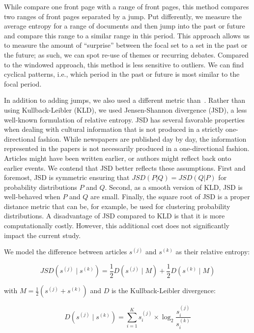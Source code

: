 \documentclass[]{ceurart}
\begin{document}
While \cite{barron_individuals_2018} compare one front page with a range of front pages, this method compares two ranges of front pages separated by a jump. Put differently, we measure the average entropy for a range of documents and then jump into the past or future and compare this range to a similar range in this period. This approach allows us to measure the amount of ``surprise'' between the focal set to a set in the past or the future; as such, we can spot re-use of themes or recurring debates. Compared to the windowed approach, this method is less sensitive to outliers. We can find cyclical patterns, i.e., which period in the past or future is most similar to the focal period.

In addition to adding jumps, we also used a different metric than~\cite{barron_individuals_2018}. Rather than using Kullback-Leibler (KLD), we used Jensen-Shannon divergence (JSD), a less well-known formulation of relative entropy. JSD has several favorable properties when dealing with cultural information that is not produced in a strictly one-directional fashion. While newspapers are published day by day, the information represented in the papers is not necessarily produced in a one-directional fashion. Articles might have been written earlier, or authors might reflect back onto earlier events. We contend that JSD better reflects these assumptions. First and foremost, JSD is symmetric ensuring that $JSD(P|Q) = JSD(Q|P)$ for probability distributions $P$ and $Q$. Second, as a smooth version of KLD, JSD is well-behaved when $P$ and $Q$ are small. Finally, the square root of JSD is a proper distance metric that can be, for example, be used for clustering probability distributions. A disadvantage of JSD compared to KLD is that it is more computationally costly. However, this additional cost does not significantly impact the current study. 

We model the difference between articles $s^{(j)}$ and $s^{(k)}$ as their relative entropy: 

\begin{equation}
    JSD (s^{(j)} \mid s^{(k)}) =  \frac{1}{2} D (s^{(j)} \mid M) + \frac{1}{2} D (s^{(k)} \mid M)\label{eq:4}
\end{equation}

\noindent with $M = \frac{1}{2} (s^{(j)} + s^{(k)})$ and $D$ is the Kullback-Leibler divergence:

\begin{equation}
    D (s^{(j)} \mid s^{(k)}) = \sum_{i = 1}^{K} s_i^{(j)} \times \log_2 \frac{s_i^{(j)}}{s_i^{(k)}}\label{eq:5}
\end{equation}
\end{document}
